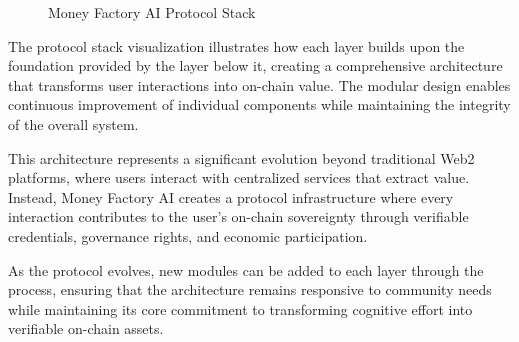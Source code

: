 \begin{figure}[H]
\caption{Money Factory AI Protocol Stack}\label{fig:protocol-stack}
\end{figure}

The protocol stack visualization illustrates how each layer builds upon the foundation provided by the layer below it, creating a comprehensive architecture that transforms user interactions into on-chain value. The modular design enables continuous improvement of individual components while maintaining the integrity of the overall system.

This architecture represents a significant evolution beyond traditional Web2 platforms, where users interact with centralized services that extract value. Instead, Money Factory AI creates a protocol infrastructure where every interaction contributes to the user's on-chain sovereignty through verifiable credentials, governance rights, and economic participation.

As the protocol evolves, new modules can be added to each layer through the  process, ensuring that the architecture remains responsive to community needs while maintaining its core commitment to transforming cognitive effort into verifiable on-chain assets.

\newpage
